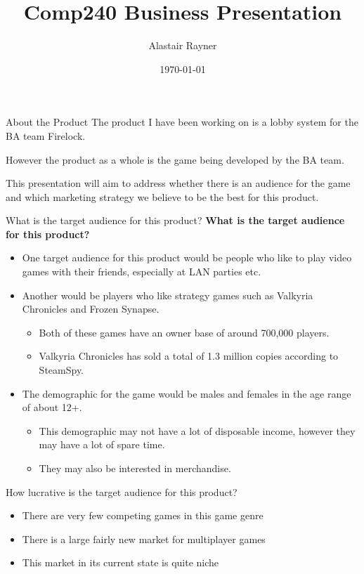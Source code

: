 \documentclass{beamer}
\title{Comp240 Business Presentation}
\author{Alastair Rayner}
\date{\today}
\begin{document}
\maketitle


\begin{frame}{About the Product}
	The product I have been working on is a lobby system for the BA team Firelock. \pause
	 
	However the product as a whole is the game being developed by the BA team. \pause
	
	This presentation will aim to address whether there is an audience for the game and which marketing strategy we believe to be the best for this product. \pause
\end{frame}


\begin{frame}{What is the target audience for this product?}		
	\textbf{What is the target audience for this product?} \pause
		\begin{itemize}
			\item One target audience for this product would be people who like to play video games with their friends, especially at LAN parties etc. \pause
			\item Another would be players who like strategy games such as Valkyria Chronicles and Frozen Synapse. \pause
				\begin{itemize}
					\item Both of these games have an owner base of around 700,000 players. \pause
					\item Valkyria Chronicles has sold a total of 1.3 million copies according to SteamSpy. \pause
				\end{itemize}	
			\item The demographic for the game would be males and females in the age range of about 12+.  \pause
				\begin{itemize}
					\item This demographic may not have a lot of disposable income, however they may have a lot of spare time. \pause
					\item They may also be interested in merchandise.
				\end{itemize}	
		\end{itemize}
\end{frame}

\begin{frame}{How lucrative is the target audience for this product?}
	\begin{itemize}
		\item There are very few competing games in this game genre \pause
		\item There is a large fairly new market for multiplayer games \pause
		\item This market in its current state is quite niche \pause
		

	\end{itemize}
\end{frame}
\end{document}
